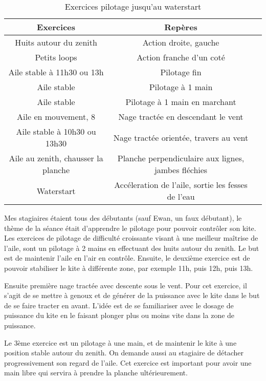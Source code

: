 \documentclass[11pt,a4paper]{report}
\begin{document}
\begin{table}
\begin{tabular}{|c|c|c|}
\hline
\textbf{Exercices}     &  \textbf{Repères}      \\
\hline 
Huits autour du zenith & Action droite, gauche   \\
\hline
Petits loops  & Action franche d'un coté  \\
\hline 
Aile stable à 11h30 ou 13h & Pilotage fin \\
\hline
Aile stable               & Pilotage à 1 main \\
\hline 
Aile stable               & Pilotage à 1 main en marchant \\
\hline
Aile en mouvement, 8      & Nage tractée en descendant le vent \\
\hline 
Aile stable à 10h30 ou 13h30   	& Nage tractée orientée, travers au vent \\
\hline
Aile au zenith, chausser la planche  & Planche perpendiculaire aux lignes, jambes fléchies \\
\hline
Waterstart                           &  Accéleration de l'aile, sortie les fesses de l'eau \\
\hline
\end{tabular}
\caption{Exercices pilotage jusqu'au waterstart\label{seance_pilotage}}
\end{table}

Mes stagiaires étaient tous des débutants (sauf Ewan, un faux débutant), 
le thème de la séance était d'apprendre le pilotage pour pouvoir contrôler son kite.
Les exercices de pilotage de difficulté croissante visant à une
meilleur maîtrise de l'aile, sont un pilotage à 2 mains en effectuant des huits
autour du zenith. Le but est de maintenir l'aile en l'air en contrôle.
Ensuite, le deuxième exercice est de pouvoir stabiliser le kite à différente 
zone, par exemple 11h, puis 12h, puis 13h.

Ensuite première nage tractée avec descente sous 
le vent. Pour cet exercice, il s'agit de se mettre à genoux
et de générer de la puissance avec le kite dans le but
de se faire tracter en avant.  L'idée est de se familiariser
avec le dosage de puissance du kite en le faisant plonger
plus ou moins vite dans la zone de puissance.

Le 3ème exercice est un pilotage à une main, et 
de maintenir le kite à une position stable autour
du zenith. On demande aussi au stagiaire de
détacher progressivement son regard de l'aile.
Cet exercice est important pour avoir une main libre
qui servira à prendre la planche ultérieurement.
\end{document}
